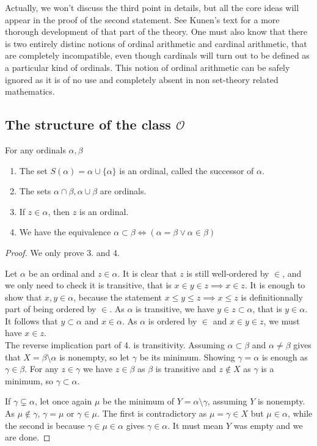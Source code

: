\documentclass{article}
\begin{document}
Actually, we won't discuss the third point in details, but all the core ideas will appear in the proof of the second statement. See Kunen's text for a more thorough development of that part of the theory. One must also know that there is two entirely distinc notions of ordinal arithmetic and cardinal arithmetic, that are completely incompatible, even though cardinals will turn out to be defined as a particular kind of ordinals. This notion of ordinal arithmetic can be safely ignored as it is of no use and completely absent in non set-theory related mathematics.

\subsection{The structure of the class $\mathcal{O}$}

\begin{lemma}
For any ordinals $\alpha, \beta$
\begin{enumerate}
    \item The set $S(\alpha) = \alpha \cup \{\alpha\}$ is an ordinal, called the successor of $\alpha$.
    \item The sets $\alpha \cap \beta, \alpha \cup \beta$ are ordinals.
    \item If $z \in \alpha$, then $z$ is an ordinal.
    \item We have the equivalence $\alpha \subset \beta \iff \left(\alpha = \beta \lor \alpha \in \beta\right )$
\end{enumerate}
\end{lemma}

\begin{proof}
We only prove 3. and 4.

Let $\alpha$ be an ordinal and $z \in \alpha$. It is clear that $z$ is still well-ordered by $\in$, and we only need to check it is transitive, that is $x \in y \in z \implies x \in z$. It is enough to show that $x, y \in \alpha$, because the statement $x \leq y \leq z \implies x \leq z$ is definitionnally part of being ordered by $\in$. 
As $\alpha$ is transitive, we have $y \in z \subset \alpha$, that is $y \in \alpha$. It follows that $y \subset \alpha$ and $x \in \alpha$. As $\alpha$ is ordered by $\in$ and $x \in y \in z$, we must have $x \in z$.\\

The reverse implication part of 4. is transitivity. Assuming $\alpha \subset \beta$ and $\alpha \neq \beta$ gives that $X = \beta \setminus \alpha$ is nonempty, so let $\gamma$ be its minimum. Showing $\gamma = \alpha$ is enough as $\gamma \in \beta$. For any $z \in \gamma$ we have $z \in \beta$ as $\beta$ is transitive and $z \not\in X$ as $\gamma$ is a minimum, so $\gamma \subset \alpha$.

If $\gamma \subsetneq \alpha$, let once again $\mu$ be the minimum of $Y = \alpha \setminus \gamma$, assuming $Y$ is nonempty. As $\mu \not\in \gamma$, $\gamma = \mu$ or $\gamma \in \mu$. The first is contradictory as $\mu = \gamma \in X$ but $\mu \in \alpha$, while the second is because $\gamma \in \mu \in \alpha$ gives $\gamma \in \alpha$. It must mean $Y$ was empty and we are done.
\end{proof}
\end{document}
